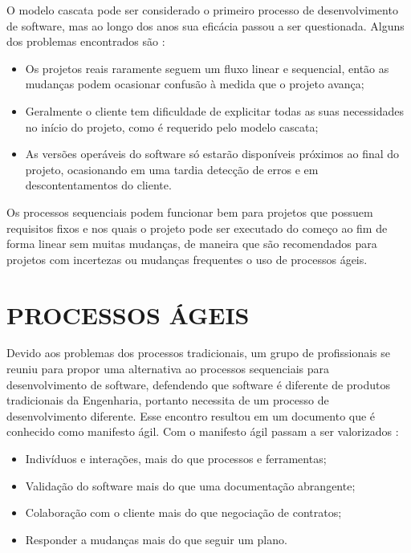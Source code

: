     O modelo cascata pode ser considerado o primeiro processo de desenvolvimento de software, mas ao longo dos anos sua eficácia passou a ser questionada. Alguns dos problemas encontrados são \cite{Pressman2015}:
        
        \begin{itemize}
            \item Os projetos reais raramente seguem um fluxo linear e sequencial, então as mudanças podem ocasionar confusão à medida que o projeto avança;
            \item Geralmente o cliente tem dificuldade de explicitar todas as suas necessidades no início do projeto, como é requerido pelo modelo cascata;
            \item As versões operáveis do software só estarão disponíveis próximos ao final do projeto, ocasionando em uma tardia detecção de erros e em descontentamentos do cliente.
        \end{itemize}
        
    Os processos sequenciais podem funcionar bem para projetos que possuem requisitos fixos e nos quais o projeto pode ser executado do começo ao fim de forma linear sem muitas mudanças, de maneira que são recomendados para projetos com incertezas ou mudanças frequentes o uso de processos ágeis.
    
    \section{PROCESSOS ÁGEIS}
    
    Devido aos problemas dos processos tradicionais, um grupo de profissionais se reuniu para propor uma alternativa ao processos sequenciais para desenvolvimento de software, defendendo que software é diferente de produtos tradicionais da Engenharia, portanto necessita de um processo de desenvolvimento diferente. Esse encontro resultou em um documento que é conhecido como manifesto ágil. Com o manifesto ágil passam a ser valorizados \cite{Valente2020}:
    \begin{itemize}
        \item Indivíduos e interações, mais do que processos e ferramentas;
        \item Validação do software mais do que uma documentação abrangente;
        \item Colaboração com o cliente mais do que negociação de contratos;
        \item Responder a mudanças mais do que seguir um plano.
    \end{itemize}
    
